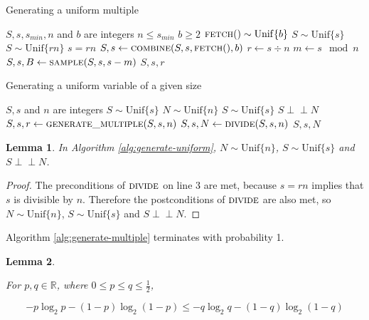 \documentclass[12pt]{article}
\newtheorem{lemma}{Lemma}
\newcommand{\indep}{\perp\!\!\!\perp}
\newcommand{\unif}[1]{\mathrm{Unif}\{#1\}}
\begin{document}
\begin{algorithm}
\caption{Generating a uniform multiple}
\label{alg:generate-multiple}
\begin{algorithmic}[1]
\Require $S, s, s_{min}, n$ and $b$ are integers
\Require $n \le s_{min}$
\Require $b \ge 2$
\Require $\textsc{fetch}() \sim \unif{b}$
\Require $S \sim \unif{s}$
\Ensure $S \sim \unif{rn}$
\Ensure $s = rn$
        \State $S, s \gets \textsc{combine}(S, s, \textsc{fetch}(), b)$
    \EndWhile
    \State $r \gets s \div n$
    \State $m \gets s \mod n$
    \State $S, s, B \gets \textsc{sample}(S, s, s-m)$ 
        \State \Return $S, s, r$
    \EndIf
  \EndWhile
\EndProcedure
\end{algorithmic}
\end{algorithm}

\begin{algorithm}
\caption{Generating a uniform variable of a given size}
\label{alg:generate-uniform}
\begin{algorithmic}[1]
\Require $S, s$ and $n$ are integers
\Require $S \sim \unif{s}$
\Ensure $N \sim \unif{n}$
\Ensure $S \sim \unif{s}$
\Ensure $S \indep N$
  \State $S, s, r \gets \textsc{generate\_multiple}(S, s, n)$
  \State $S, s, N \gets \textsc{divide}(S, s, n)$
  \State \Return $S, s, N$
\EndProcedure
\end{algorithmic}
\end{algorithm}

\begin{lemma}
    In Algorithm \ref{alg:generate-uniform}, $N \sim \unif{n}$, $S \sim \unif{s}$ and $S \indep N$.
\end{lemma}

\begin{proof}
    The preconditions of $\textsc{divide}$ on line 3 are met, because $s=rn$ implies that $s$ is divisible by $n$. Therefore the postconditions of $\textsc{divide}$ are also met, so $N \sim \unif{n}$, $S \sim \unif{s}$ and $S \indep N$.
\end{proof}

Algorithm \ref{alg:generate-multiple} terminates with probability 1.

\begin{lemma}
    \label{lem:shannon-inequality}

For $p,q \in \mathbb{R}$, where $0 \le p\le q \le \frac{1}{2}$, 

\begin{equation}
-p\log_2 p - (1-p)\log_2(1-p) \le -q\log_2 q - (1-q)\log_2(1-q)
\end{equation}
\end{lemma}
\end{document}
